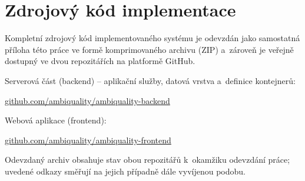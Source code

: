 \chapter{Zdrojový kód implementace}
\label{app:implementace-repo}

Kompletní zdrojový kód implementovaného systému je odevzdán jako samostatná příloha této práce ve formě komprimovaného archivu (ZIP) a~zároveň je veřejně dostupný ve dvou repozitářích na platformě GitHub.

Serverová část (backend) -- aplikační služby, datová vrstva a~definice kontejnerů:

\begin{center}
\href{https://github.com/ambiquality/ambiquality-backend}{github.com/ambiquality/ambiquality-backend}
\end{center}

Webová aplikace (frontend):

\begin{center}
\href{https://github.com/ambiquality/ambiquality-frontend}{github.com/ambiquality/ambiquality-frontend}
\end{center}

Odevzdaný archiv obsahuje stav obou repozitářů k~okamžiku odevzdání práce; uvedené odkazy směřují na jejich případně dále vyvíjenou podobu.
